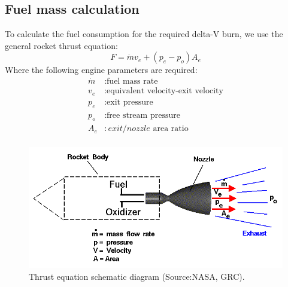 \subsection{Fuel mass calculation}
To calculate the fuel consumption for the required delta-V burn, we use the general rocket thrust equation:
\begin{equation}
F = \dot{m}v_e+(p_e-p_o)A_e
\end{equation}
Where the following engine parameters are required:
\begin{equation}
\begin{split}
\dot{m}&:\text{fuel mass rate}\\
v_e&:\text{equivalent velocity-exit velocity}\\
p_e&:\text{exit pressure}\\
p_o&:\text{free stream pressure}\\
A_e&:exit/nozzle \text{ area ratio}\\
\end{split}
\end{equation}

\begin{figure}[htb]
\centering
\includegraphics[scale=0.4]{figures/Orbiter/rockth.png}
\caption{Thrust equation schematic diagram (Source:NASA, GRC).\cite{rocketeq}}
\label{fig:rocketim}
\end{figure}

